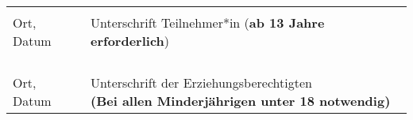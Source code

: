 \begin{Form}
    \vspace*{1.5cm} %
    \footnotesize
    \begin{tabularx}{\linewidth}{p{7cm}X}
        \noindent\hrulefill & \noindent\hrulefill                                            \\
        Ort, Datum          & Unterschrift Teilnehmer*in (\textbf{ab 13 Jahre erforderlich}) \\
        &                                                                \\
        &                                                                \\
        &                                                                \\
        \noindent\hrulefill & \noindent\hrulefill                                            \\
        Ort, Datum          & \makecell[l]{Unterschrift der Erziehungsberechtigten           \\\textbf{(Bei allen Minderjährigen unter 18 notwendig)}}
    \end{tabularx}
\end{Form} 
\clearpage

